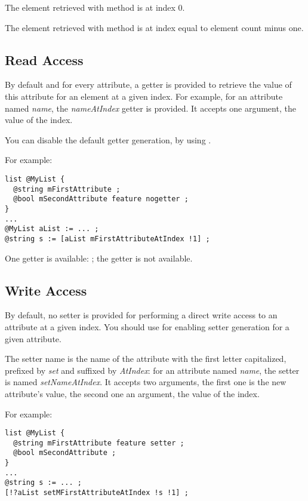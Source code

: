The element retrieved with  method is at index 0.

The element retrieved with  method is at index equal to element count minus one.

\subsection{Read Access}

By default and for every attribute, a getter is provided to retrieve the value of this attribute for an element at a given index. For example, for an attribute named \emph{name}, the \emph{nameAtIndex} getter is provided. It accepts one  argument, the value of the index.

You can disable the default getter generation, by using .

For example:
\begin{lstlisting}[language=galgas]
list @MyList {
  @string mFirstAttribute ;
  @bool mSecondAttribute feature nogetter ;
}
...
@MyList aList := ... ;
@string s := [aList mFirstAttributeAtIndex !1] ;
\end{lstlisting}

One getter is available: ; the  getter is not available.


\subsection{Write Access}

By default, no setter is provided for performing a direct write access to an attribute at a given index. You should use  for enabling setter generation for a given attribute.

The setter name is the name of the attribute with the first letter capitalized, prefixed by \emph{set} and suffixed by \emph{AtIndex}: for an attribute named \emph{name}, the setter is named \emph{setNameAtIndex}. It accepts two arguments, the first one is the new attribute's value, the second one an  argument, the value of the index.

For example:

\begin{lstlisting}[language=galgas]
list @MyList {
  @string mFirstAttribute feature setter ;
  @bool mSecondAttribute ;
}
...
@string s := ... ;
[!?aList setMFirstAttributeAtIndex !s !1] ;
\end{lstlisting}

